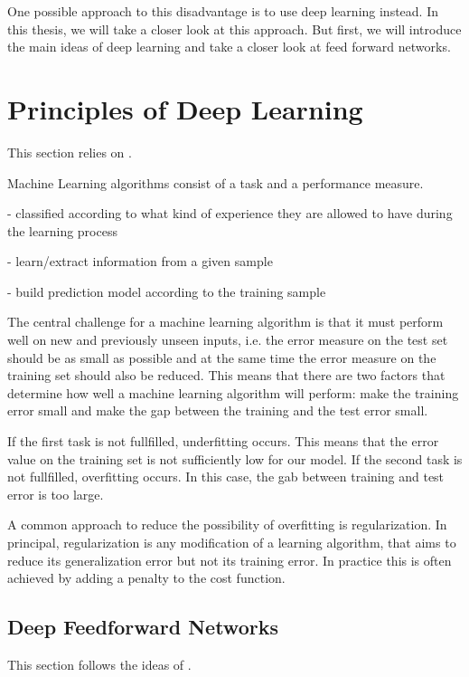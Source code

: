 \documentclass[12pt, a4paper]{article}
\theoremstyle{definition}
\theoremstyle{plain}
\numberwithin{equation}{section}
\numberwithin{figure}{section}
\numberwithin{table}{section}
\begin{document}
	One possible approach to this disadvantage is to use deep learning instead.
	In this thesis, we will take a closer look at this approach.
	But first, we will introduce the main ideas of deep learning and take a closer look at feed forward networks.
	\newpage
	
	\section{Principles of Deep Learning}\label{basicsdl}
	This section relies on \citet*{deeplbook}.
	
	
	Machine Learning algorithms consist of a task and a performance measure.
	
	- classified according to what kind of experience they are allowed to have during the learning process
	
	- learn/extract information from a given sample
	
	- build prediction model according to the training sample
	
	
	
	The central challenge for a machine learning algorithm is that it must perform well on new and previously unseen inputs, i.e. the error measure on the test set should be as small as possible and at the same time the error measure on the training set should also be reduced.
	This means that there are two factors that determine how well a machine learning algorithm will perform:
	make the training error small and make the gap between the training and the test error small.
	
	If the first task is not fullfilled, underfitting occurs. This means that the error value on the training set is not sufficiently low for our model.
	If the second task is not fullfilled, overfitting occurs. In this case, the gab between training and test error is too large.
	
	
	A common approach to reduce the possibility of overfitting is regularization.
	In principal, regularization is any modification of a learning algorithm, that aims to reduce its generalization error but not its training error.
	In practice this is often achieved by adding a penalty to the cost function.
	
	
	\subsection{Deep Feedforward Networks}\label{sec:dffn}
	This section follows the ideas of \citet*{deeplbook}.
	
\end{document}

